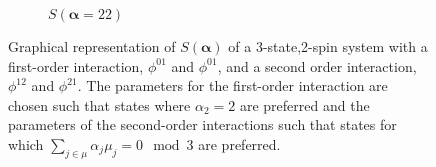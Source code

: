 \begin{figure}[h!]
\begin{subfigure}[b]{0.33\textwidth}
{}
            \caption{$S(\boldsymbol{\alpha} = 22)$}\label{fig:case_3_s_alpha_22}
    \end{subfigure}
    \caption{Graphical representation of $S({\boldsymbol{\alpha}})$ of a 3-state,2-spin system with a first-order interaction, $\phi^{01}$ and $\phi^{01}$, and a second order interaction, $\phi^{12}$ and $\phi^{21}$. The parameters for the first-order interaction are chosen such that states where $\alpha_2 = 2$ are preferred and the parameters of the second-order interactions such that states for which  $\sum_{j \in \mu} \alpha_j \mu_j =  0\mod3$ are preferred.}
    \label{fig:s_case_3}
\end{figure}

